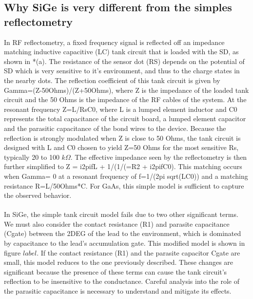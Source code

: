 \documentclass{article}
\begin{document}
\subsection{Why SiGe is very different from the simples reflectometry} %
	\label{sub:why_sige_is_very_different_from_the_simples_reflectometry}
	In RF reflectometry, a fixed frequency signal is reflected off an impedance matching inductive capacitive (LC) tank circuit that is loaded with the SD, as shown in *(a).  The resistance of the sensor dot (RS) depends on the potential of SD which is very sensitive to it’s environment, and thus to the charge states in the nearby dots.   The reflection coefficient of this tank circuit is given by Gamma=(Z-50Ohms)/(Z+50Ohms), where Z is the impedance of the loaded tank circuit and the 50 Ohms is the impedance of the RF cables of the system.  At the resonant frequency Z=L/RsC0, where L is a lumped element inductor and C0 represents the total capacitance of the circuit board, a lumped element capacitor and the parasitic capacitance of the bond wires to the device.  Because the reflection is strongly modulated when Z is close to 50 Ohms, the tank circuit is designed with L and C0 chosen to yield Z=50 Ohms for the most sensitive Rs, typically 20 to 100 $k\Omega$.  The effective impedance seen by the reflectometry is then further simplified to Z = i2pifL + 1/(1/(=R2 + i2pifC0).   This matching occurs when Gamma= 0 at a resonant frequency of f=1/(2pi sqrt(LC0)) and a matching resistance R=L/50Ohms*C.  For GaAs, this simple model is sufficient to capture the observed behavior. 
	\\ \\
	In SiGe, the simple tank circuit model fails due to two other significant terms.  We must also consider the contact resistance (R1) and parasite capacitance (Cgate) between the 2DEG of the lead to the environment, which is dominated by capacitance to the lead’s accumulation gate.  This modified model is shown in figure $label$.  If the contact resistance (R1) and the parasite capacitor Cgate are small, this model reduces to the one previously described.  These changes are significant because the presence of these terms can cause the tank circuit’s reflection to be insensitive to the conductance. Careful analysis into the role of the parasitic capacitance is necessary to understand and mitigate its effects.  
	\\ \\
\end{document}
